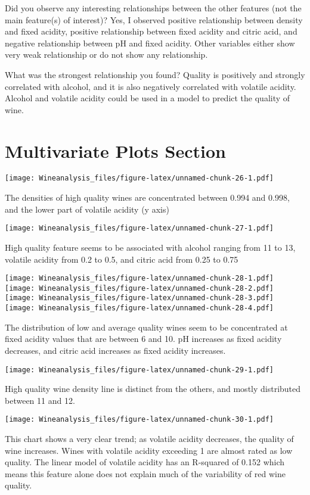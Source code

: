 \documentclass[]{article}
\begin{document}
Did you observe any interesting relationships between the other features
(not the main feature(s) of interest)? Yes, I observed positive
relationship between density and fixed acidity, positive relationship
between fixed acidity and citric acid, and negative relationship between
pH and fixed acidity. Other variables either show very weak relationship
or do not show any relationship.

What was the strongest relationship you found? Quality is positively and
strongly correlated with alcohol, and it is also negatively correlated
with volatile acidity. Alcohol and volatile acidity could be used in a
model to predict the quality of wine.

\section{Multivariate Plots Section}\label{multivariate-plots-section}

\texttt{[image: Wineanalysis\_files/figure-latex/unnamed-chunk-26-1.pdf]}

The densities of high quality wines are concentrated between 0.994 and
0.998, and the lower part of volatile acidity (y axis)

\texttt{[image: Wineanalysis\_files/figure-latex/unnamed-chunk-27-1.pdf]}

High quality feature seems to be associated with alcohol ranging from 11
to 13, volatile acidity from 0.2 to 0.5, and citric acid from 0.25 to
0.75

\texttt{[image: Wineanalysis\_files/figure-latex/unnamed-chunk-28-1.pdf]}
\texttt{[image: Wineanalysis\_files/figure-latex/unnamed-chunk-28-2.pdf]}
\texttt{[image: Wineanalysis\_files/figure-latex/unnamed-chunk-28-3.pdf]}
\texttt{[image: Wineanalysis\_files/figure-latex/unnamed-chunk-28-4.pdf]}

The distribution of low and average quality wines seem to be
concentrated at fixed acidity values that are between 6 and 10. pH
increases as fixed acidity decreases, and citric acid increases as fixed
acidity increases.

\texttt{[image: Wineanalysis\_files/figure-latex/unnamed-chunk-29-1.pdf]}

High quality wine density line is distinct from the others, and mostly
distributed between 11 and 12.

\texttt{[image: Wineanalysis\_files/figure-latex/unnamed-chunk-30-1.pdf]}

This chart shows a very clear trend; as volatile acidity decreases, the
quality of wine increases. Wines with volatile acidity exceeding 1 are
almost rated as low quality. The linear model of volatile acidity has an
R-squared of 0.152 which means this feature alone does not explain much
of the variability of red wine quality.
\end{document}

